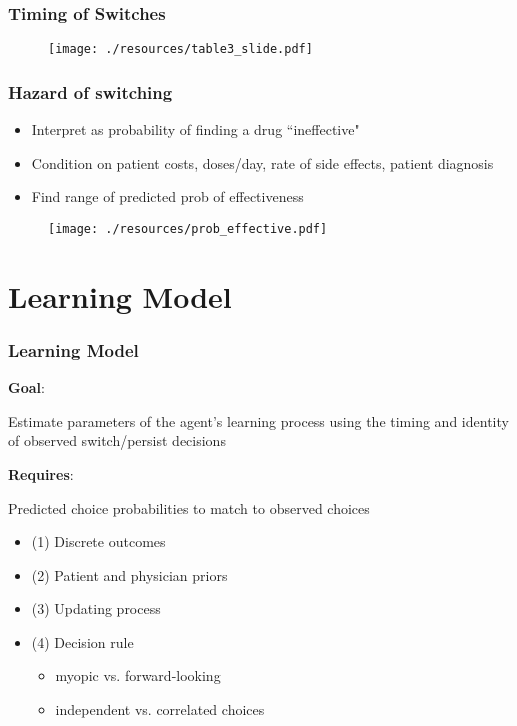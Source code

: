 \begin{frame}
\frametitle{Timing of Switches}

\begin{figure}[h!]
\centering\texttt{[image: ./resources/table3\_slide.pdf]}
\end{figure}
\end{frame}


\begin{frame}
\frametitle{Hazard of switching}

\begin{itemize}
\item Interpret as probability of finding a drug ``ineffective"

\item Condition on patient costs, doses/day, rate of side effects, patient
diagnosis

\item Find range of predicted prob of effectiveness
\end{itemize}

\begin{figure}[h!]
\centering\texttt{[image: ./resources/prob\_effective.pdf]}
\end{figure}
\end{frame}

\section{Learning Model}


\begin{frame}
\frametitle{Learning Model}

\textbf{Goal}:

Estimate parameters of the agent's learning process using the timing and
identity of observed switch/persist decisions

\textbf{Requires}:

Predicted choice probabilities to match to observed choices

\begin{itemize}
\item (1) Discrete outcomes

\item (2) Patient and physician priors

\item (3) Updating process

\item (4) Decision rule

\begin{itemize}
\item myopic vs. forward-looking

\item independent vs. correlated choices
\end{itemize}
\end{itemize}
\end{frame}

